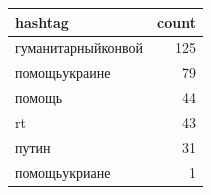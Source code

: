 \begin{tabular}{lr}
\toprule
hashtag & count \\
\midrule
гуманитарныйконвой & 125 \\
помощьукраине & 79 \\
помощь & 44 \\
rt & 43 \\
путин & 31 \\
помощьукриане & 1 \\
\bottomrule
\end{tabular}
